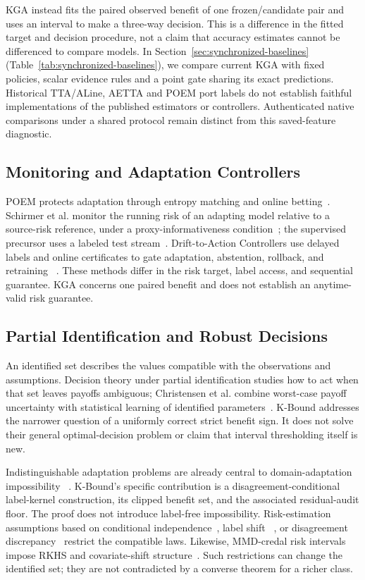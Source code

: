 KGA instead fits the paired observed benefit of one frozen/candidate pair and uses an interval
to make a three-way decision. This is a difference in the fitted target and decision procedure,
not a claim that accuracy estimates cannot be differenced to compare models. In Section~\ref{sec:synchronized-baselines}
(Table~\ref{tab:synchronized-baselines}), we compare current KGA with fixed
policies, scalar evidence rules and a point gate sharing its exact predictions.
Historical TTA/ALine, AETTA and POEM port labels do not establish faithful
implementations of the published estimators or controllers. Authenticated native
comparisons under a shared protocol remain distinct from this saved-feature diagnostic.

\subsection{Monitoring and Adaptation Controllers}

POEM protects adaptation through entropy matching and online betting~\cite{bar2024poem}.
Schirmer et al. monitor the running risk of an adapting model relative to a source-risk reference,
under a proxy-informativeness condition~\cite{schirmer2025monitoring}; the supervised precursor
uses a labeled test stream~\cite{podkopaev2022tracking}. Drift-to-Action Controllers use delayed
labels and online certificates to gate adaptation, abstention, rollback, and retraining
~\cite{lamaakal2026drifttoaction}. These methods differ in the risk target, label access, and
sequential guarantee. KGA concerns one paired benefit and does not establish an anytime-valid
risk guarantee.

\subsection{Partial Identification and Robust Decisions}

An identified set describes the values compatible with the observations and assumptions.
Decision theory under partial identification studies how to act when that set leaves payoffs
ambiguous; Christensen et al. combine worst-case payoff uncertainty with statistical learning of
identified parameters~\cite{christensen2026optimal}. K-Bound addresses the narrower question of
a uniformly correct strict benefit sign. It does not solve their general optimal-decision problem
or claim that interval thresholding itself is new.

Indistinguishable adaptation problems are already central to domain-adaptation impossibility
~\cite{bendavid2010theory,bendavid2010impossibility}. K-Bound's specific contribution is a
disagreement-conditional label-kernel construction, its clipped benefit set, and the associated
residual-audit floor. The proof does not introduce label-free impossibility.
Risk-estimation assumptions based on conditional independence~\cite{steinhardt2016}, label shift
~\cite{lipton2018bbse,garg2020labelshift}, or disagreement discrepancy~\cite{rosenfeld2023dis2}
restrict the compatible laws. Likewise, MMD-credal risk intervals impose RKHS and covariate-shift
structure~\cite{ariq2026mmd}. Such restrictions can change the identified set; they are not
contradicted by a converse theorem for a richer class.

